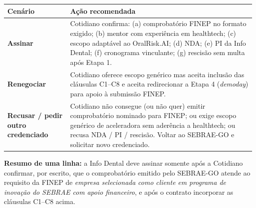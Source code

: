 \documentclass[11pt, a4paper]{article}
\newcommand{\destaque}[2]{%
    \vspace{2pt}
    \colorbox{#1!10}{%
        \parbox{\dimexpr\textwidth-2\fboxsep}{%
            \small #2%
        }%
    }
    \vspace{4pt}
}
\begin{document}
\renewcommand{\arraystretch}{1.3}
\begin{table}[H]
    \centering
    \small
    \begin{tabularx}{\textwidth}{@{} l X @{}}
        \toprule
        \rowcolor{tableHeader} \textbf{Cenário} & \textbf{Ação recomendada} \\
        \midrule
        \textcolor{successGreen}{\textbf{Assinar}} & Cotidiano confirma: (a) comprobatório FINEP no formato exigido; (b) mentor com experiência em healthtech; (c) escopo adaptável ao OralRisk.AI; (d) NDA; (e) PI da Info Dental; (f) cronograma vinculante; (g) rescisão sem multa após Etapa 1. \\
        \rowcolor{lightGray}
        \textcolor{warningOrange}{\textbf{Renegociar}} & Cotidiano oferece escopo genérico mas aceita inclusão das cláusulas C1--C8 e aceita redirecionar a Etapa 4 (\textit{demoday}) para apoio à submissão FINEP. \\
        \textcolor{accentColor}{\textbf{Recusar / pedir outro credenciado}} & Cotidiano não consegue (ou não quer) emitir comprobatório nominado para FINEP; ou exige escopo genérico de aceleradora sem aderência a healthtech; ou recusa NDA / PI / rescisão. Voltar ao SEBRAE-GO e solicitar novo credenciado. \\
        \bottomrule
    \end{tabularx}
\end{table}

\destaque{primaryColor}{%
    \textcolor{primaryColor}{\textbf{Resumo de uma linha:}} a Info Dental deve assinar somente após a Cotidiano confirmar, por escrito, que o comprobatório emitido pelo SEBRAE-GO atende ao requisito da FINEP de \emph{empresa selecionada como cliente em programa de inovação do SEBRAE com apoio financeiro}, e após o contrato incorporar as cláusulas C1--C8 acima.%
}
\end{document}
